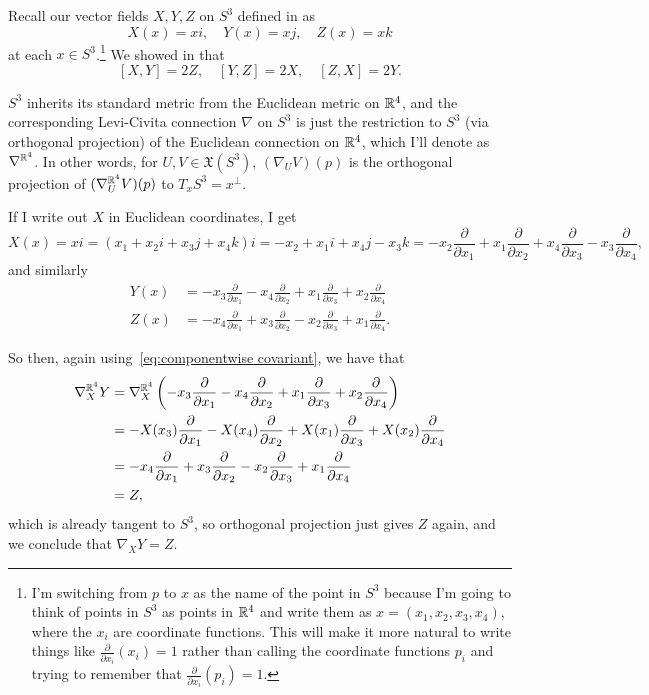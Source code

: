 \begin{example}
	Recall our vector fields $X, Y, Z$ on $S^3$ defined in  as
	\[
		X(x) = xi, \quad Y(x) = xj, \quad Z(x) = xk
	\]
	at each $x \in S^3$.\footnote{I'm switching from $p$ to $x$ as the name of the point in $S^3$ because I'm going to think of points in $S^3$ as points in $\mathbb{R}^4$ and write them as $x = (x_1, x_2,x_3,x_4)$, where the $x_i$ are coordinate functions. This will make it more natural to write things like $\frac{\partial}{\partial x_i}(x_i) = 1$ rather than calling the coordinate functions $p_i$ and trying to remember that $\frac{\partial}{\partial x_i}(p_i) = 1$.} We showed in  that
	\begin{equation}\label{eq:Lie brackets on S^3}
		[X,Y] = 2Z, \quad [Y,Z] = 2X, \quad [Z,X] = 2Y.
	\end{equation}
	
	$S^3$ inherits its standard metric from the Euclidean metric on $\mathbb{R}^4$, and the corresponding Levi-Civita connection $\nabla$ on $S^3$ is just the restriction to $S^3$ (via orthogonal projection) of the Euclidean connection on $\mathbb{R}^4$, which I'll denote as $\nabla^{\mathbb{R}^4}$. In other words, for $U,V \in \mathfrak{X}(S^3)$, $(\nabla_UV)(p)$ is the orthogonal projection of $(\nabla_U^{\mathbb{R}^4}V)(p)$ to $T_xS^3 = x^\bot$.
	
	If I write out $X$ in Euclidean coordinates, I get
	\[
		X(x) = xi = (x_1 + x_2i + x_3j + x_4k)i = -x_2 + x_1i + x_4j - x_3k = -x_2 \frac{\partial}{\partial x_1} + x_1 \frac{\partial}{\partial x_2} + x_4 \frac{\partial}{\partial x_3} - x_3 \frac{\partial}{\partial x_4},
	\]
	and similarly
	\begin{align*}
		Y(x) & = -x_3\frac{\partial}{\partial x_1} -x_4 \frac{\partial}{\partial x_2}+ x_1\frac{\partial}{\partial x_3} + x_2\frac{\partial}{\partial x_4} \\
		Z(x) & = -x_4\frac{\partial}{\partial x_1} +x_3\frac{\partial}{\partial x_2} - x_2\frac{\partial}{\partial x_3} + x_1\frac{\partial}{\partial x_4}.
	\end{align*}
	
	So then, again using~\eqref{eq:componentwise covariant}, we have that
	\begin{align*}
		\nabla_X^{\mathbb{R}^4}Y & = \nabla_X^{\mathbb{R}^4}\left( -x_3\frac{\partial}{\partial x_1} -x_4 \frac{\partial}{\partial x_2}+ x_1\frac{\partial}{\partial x_3} + x_2\frac{\partial}{\partial x_4}\right) \\
		& =  -X(x_3)\frac{\partial}{\partial x_1} -X(x_4) \frac{\partial}{\partial x_2}+ X(x_1)\frac{\partial}{\partial x_3} + X(x_2)\frac{\partial}{\partial x_4} \\
		& = -x_4\frac{\partial}{\partial x_1} +x_3 \frac{\partial}{\partial x_2} - x_2\frac{\partial}{\partial x_3} + x_1\frac{\partial}{\partial x_4}\\
		& = Z,
	\end{align*}
	which is already tangent to $S^3$, so orthogonal projection just gives $Z$ again, and we conclude that $\nabla_XY = Z$.
	

\end{example}

